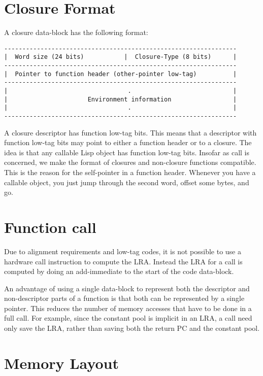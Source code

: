 
\section{Closure Format}

A closure data-block has the following format:
\begin{verbatim}
----------------------------------------------------------------
|  Word size (24 bits)           |  Closure-Type (8 bits)      |
----------------------------------------------------------------
|  Pointer to function header (other-pointer low-tag)          |
----------------------------------------------------------------
|                                 .                            |
|                      Environment information                 |
|                                 .                            |
----------------------------------------------------------------
\end{verbatim}

A closure descriptor has function low-tag bits.  This means that a descriptor
with function low-tag bits may point to either a function header or to a
closure.  The idea is that any callable Lisp object has function low-tag bits.
Insofar as call is concerned, we make the format of closures and non-closure
functions compatible.  This is the reason for the self-pointer in a function
header.  Whenever you have a callable object, you just jump through the second
word, offset some bytes, and go.



\section{Function call}

Due to alignment requirements and low-tag codes, it is not possible to use a
hardware call instruction to compute the LRA.  Instead the LRA
for a call is computed by doing an add-immediate to the start of the code
data-block.

An advantage of using a single data-block to represent both the descriptor and
non-descriptor parts of a function is that both can be represented by a
single pointer.  This reduces the number of memory accesses that have to be
done in a full call.  For example, since the constant pool is implicit in an
LRA, a call need only save the LRA, rather than saving both the
return PC and the constant pool.



\section{Memory Layout}

